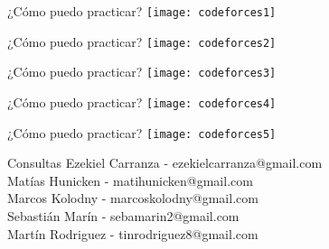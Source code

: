 \documentclass{beamer}
\begin{document}
\begin{frame}{¿Cómo puedo practicar?}
	\texttt{[image: codeforces1]}
\end{frame}
\begin{frame}{¿Cómo puedo practicar?}
	\texttt{[image: codeforces2]}
\end{frame}
\begin{frame}{¿Cómo puedo practicar?}
	\texttt{[image: codeforces3]}
\end{frame}
\begin{frame}{¿Cómo puedo practicar?}
	\texttt{[image: codeforces4]}
\end{frame}
\begin{frame}{¿Cómo puedo practicar?}
	\texttt{[image: codeforces5]}
\end{frame}

\begin{frame}{}
  \begin{block}{Consultas}
	Ezekiel Carranza - ezekielcarranza@gmail.com\\
    Matías Hunicken - matihunicken@gmail.com\\
    Marcos Kolodny - marcoskolodny@gmail.com\\
    Sebastián Marín - sebamarin2@gmail.com\\
    Martín Rodriguez - tinrodriguez8@gmail.com\\
  \end{block}
\end{frame}
\end{document}
